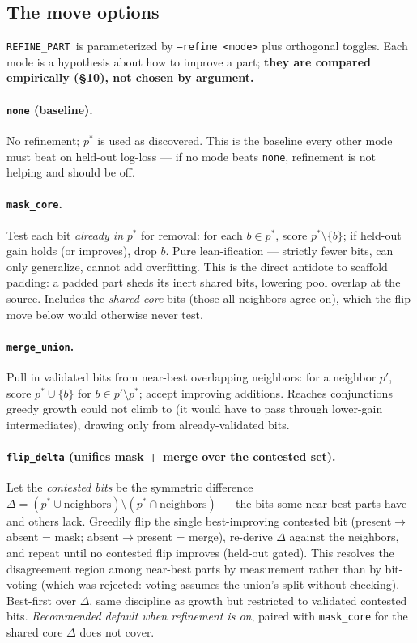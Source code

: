 \documentclass[11pt]{article}
\newcommand{\code}[1]{\texttt{#1}}
\newcommand{\refine}{\code{REFINE\_PART}}
\begin{document}
\subsection{The move options}
\refine\ is parameterized by \code{--refine <mode>} plus orthogonal toggles. Each mode is a hypothesis about how to improve a part; \textbf{they are compared empirically (\S10), not chosen by argument.}

\paragraph{\code{none} (baseline).} No refinement; $p^*$ is used as discovered. This is the baseline every other mode must beat on held-out log-loss --- if no mode beats \code{none}, refinement is not helping and should be off.

\paragraph{\code{mask\_core}.} Test each bit \emph{already in} $p^*$ for removal: for each $b\in p^*$, score $p^*\setminus\{b\}$; if held-out gain holds (or improves), drop $b$. Pure lean-ification --- strictly fewer bits, can only generalize, cannot add overfitting. This is the direct antidote to scaffold padding: a padded part sheds its inert shared bits, lowering pool overlap at the source. Includes the \emph{shared-core} bits (those all neighbors agree on), which the flip move below would otherwise never test.

\paragraph{\code{merge\_union}.} Pull in validated bits from near-best overlapping neighbors: for a neighbor $p'$, score $p^*\cup\{b\}$ for $b\in p'\setminus p^*$; accept improving additions. Reaches conjunctions greedy growth could not climb to (it would have to pass through lower-gain intermediates), drawing only from already-validated bits.

\paragraph{\code{flip\_delta} (unifies mask + merge over the contested set).} Let the \emph{contested bits} be the symmetric difference $\Delta=(p^*\cup\text{neighbors})\setminus(p^*\cap\text{neighbors})$ --- the bits some near-best parts have and others lack. Greedily flip the single best-improving contested bit (present$\to$absent = mask; absent$\to$present = merge), re-derive $\Delta$ against the neighbors, and repeat until no contested flip improves (held-out gated). This resolves the disagreement region among near-best parts by measurement rather than by bit-voting (which was rejected: voting assumes the union's split without checking). Best-first over $\Delta$, same discipline as growth but restricted to validated contested bits. \emph{Recommended default when refinement is on}, paired with \code{mask\_core} for the shared core $\Delta$ does not cover.
\end{document}
